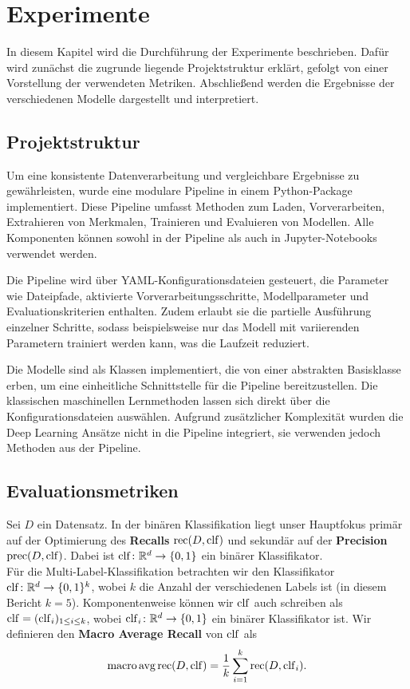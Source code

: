 \section{Experimente}
In diesem Kapitel wird die Durchführung der Experimente beschrieben. Dafür wird zunächst die zugrunde liegende Projektstruktur erklärt, gefolgt von einer Vorstellung der verwendeten Metriken. Abschließend werden die Ergebnisse der verschiedenen Modelle dargestellt und interpretiert.

\subsection{Projektstruktur}
\label{sec:projektstruktur}
Um eine konsistente Datenverarbeitung und vergleichbare Ergebnisse zu gewährleisten, wurde eine modulare Pipeline in einem Python-Package implementiert. Diese Pipeline umfasst Methoden zum Laden, Vorverarbeiten, Extrahieren von Merkmalen, Trainieren und Evaluieren von Modellen. Alle Komponenten können sowohl in der Pipeline als auch in Jupyter-Notebooks verwendet werden. 

Die Pipeline wird über YAML-Konfigurationsdateien gesteuert, die Parameter wie Dateipfade, aktivierte Vorverarbeitungsschritte, Modellparameter und Evaluationskriterien enthalten. Zudem erlaubt sie die partielle Ausführung einzelner Schritte, sodass beispielsweise nur das Modell mit variierenden Parametern trainiert werden kann, was die Laufzeit reduziert.

Die Modelle sind als Klassen implementiert, die von einer abstrakten Basisklasse erben, um eine einheitliche Schnittstelle für die Pipeline bereitzustellen. Die klassischen maschinellen Lernmethoden lassen sich direkt über die Konfigurationsdateien auswählen. Aufgrund zusätzlicher Komplexität wurden die Deep Learning Ansätze nicht in die Pipeline integriert, sie verwenden jedoch Methoden aus der Pipeline.

\subsection{Evaluationsmetriken}
\label{sec:evaluationsmetriken}
Sei $D$ ein Datensatz. In der binären Klassifikation liegt unser Hauptfokus primär auf der Optimierung des \textbf{Recalls} $\operatorname{rec}(D, \operatorname{clf})$ und sekundär auf der \textbf{Precision} $\operatorname{prec}(D, \operatorname{clf})$. Dabei ist $\operatorname{clf}\colon\mathbb{R}^d\to \{0, 1\}$ ein binärer Klassifikator.\\

Für die Multi-Label-Klassifikation betrachten wir den Klassifikator $\operatorname{clf}\colon\mathbb{R}^d\to\{0, 1\}^k$, wobei $k$ die Anzahl der verschiedenen Labels ist (in diesem Bericht $k=5$). Komponentenweise können wir $\operatorname{clf}$ auch schreiben als $\operatorname{clf} = (\operatorname{clf}_i)_{1\leq i\leq k}$, wobei $\operatorname{clf}_i\colon\mathbb{R}^d\to\{0, 1\}$ ein binärer Klassifikator ist. Wir definieren den \textbf{Macro Average Recall} von $\operatorname{clf}$ als
\begin{equation*}
    \operatorname{macro\,avg\,rec}(D, \operatorname{clf}) = \frac{1}{k}\sum_{i=1}^k\operatorname{rec} (D, \operatorname{clf}_i).
\end{equation*}

